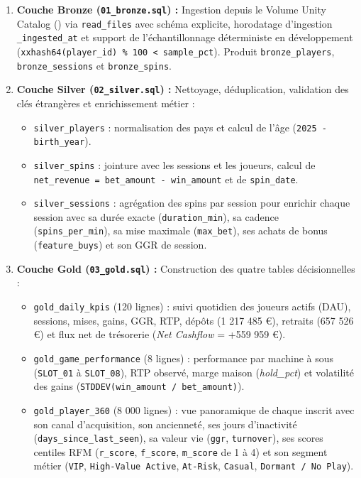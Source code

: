 \documentclass[11pt,a4paper]{article}
\begin{document}
\begin{enumerate}
    \item \textbf{Couche Bronze (\texttt{01\_bronze.sql}) :} Ingestion depuis le Volume Unity Catalog () via \texttt{read\_files} avec schéma explicite, horodatage d'ingestion \texttt{\_ingested\_at} et support de l'échantillonnage déterministe en développement (\texttt{xxhash64(player\_id) \% 100 < sample\_pct}). Produit \texttt{bronze\_players}, \texttt{bronze\_sessions} et \texttt{bronze\_spins}.
    \item \textbf{Couche Silver (\texttt{02\_silver.sql}) :} Nettoyage, déduplication, validation des clés étrangères et enrichissement métier :
    \begin{itemize}
        \item \texttt{silver\_players} : normalisation des pays et calcul de l'âge (\texttt{2025 - birth\_year}).
        \item \texttt{silver\_spins} : jointure avec les sessions et les joueurs, calcul de \texttt{net\_revenue = bet\_amount - win\_amount} et de \texttt{spin\_date}.
        \item \texttt{silver\_sessions} : agrégation des spins par session pour enrichir chaque session avec sa durée exacte (\texttt{duration\_min}), sa cadence (\texttt{spins\_per\_min}), sa mise maximale (\texttt{max\_bet}), ses achats de bonus (\texttt{feature\_buys}) et son GGR de session.
    \end{itemize}
    \item \textbf{Couche Gold (\texttt{03\_gold.sql}) :} Construction des quatre tables décisionnelles :
    \begin{itemize}
        \item \texttt{gold\_daily\_kpis} (120 lignes) : suivi quotidien des joueurs actifs (DAU), sessions, mises, gains, GGR, RTP, dépôts (1 217 485 \euro), retraits (657 526 \euro) et flux net de trésorerie (\textit{Net Cashflow} = +559 959 \euro).
        \item \texttt{gold\_game\_performance} (8 lignes) : performance par machine à sous (\texttt{SLOT\_01} à \texttt{SLOT\_08}), RTP observé, marge maison (\textit{hold\_pct}) et volatilité des gains (\texttt{STDDEV(win\_amount / bet\_amount)}).
        \item \texttt{gold\_player\_360} (8 000 lignes) : vue panoramique de chaque inscrit avec son canal d'acquisition, son ancienneté, ses jours d'inactivité (\texttt{days\_since\_last\_seen}), sa valeur vie (\texttt{ggr}, \texttt{turnover}), ses scores centiles RFM (\texttt{r\_score}, \texttt{f\_score}, \texttt{m\_score} de 1 à 4) et son segment métier (\texttt{VIP}, \texttt{High-Value Active}, \texttt{At-Risk}, \texttt{Casual}, \texttt{Dormant / No Play}).

\end{itemize}
\end{enumerate}
\end{document}

